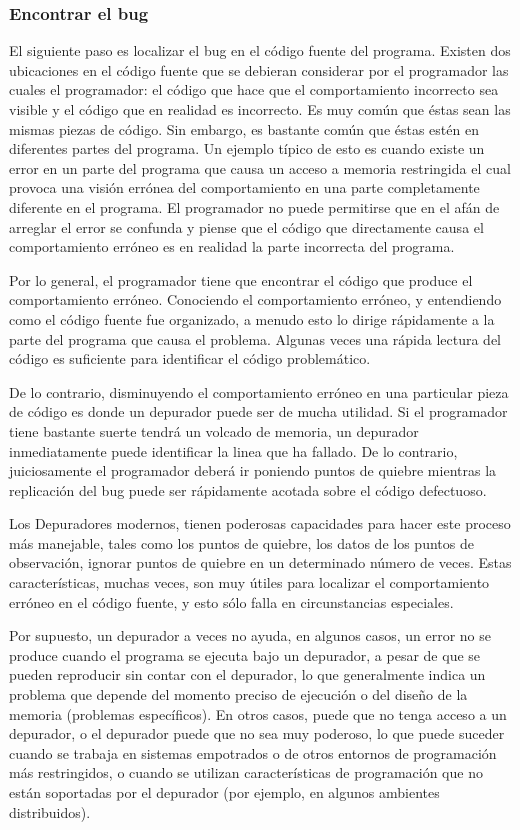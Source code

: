\documentclass[12pt,legalpaper]{report}
\begin{document}
\subsubsection{Encontrar el bug}

El siguiente paso es localizar el bug en el código fuente del programa.  Existen dos ubicaciones en el código fuente que se debieran considerar por el programador las cuales el programador: el código que hace que el comportamiento incorrecto sea visible y el código que en realidad es incorrecto.  Es muy común que éstas sean las mismas piezas de código.  Sin embargo, es bastante común que éstas estén en diferentes partes del programa.  Un ejemplo típico de esto es cuando existe un error en un parte del programa que causa un acceso a memoria restringida el cual provoca una visión errónea del comportamiento en una parte completamente diferente en el programa.  El programador no puede permitirse que en el afán de arreglar el error se confunda y piense que el código que directamente causa el comportamiento erróneo es en realidad la parte incorrecta del programa.

Por lo general, el programador tiene que encontrar el código que produce el comportamiento erróneo.  Conociendo el comportamiento erróneo, y entendiendo como el código fuente fue organizado, a menudo esto lo dirige rápidamente a la parte del programa que causa el problema.  Algunas veces una rápida lectura del código es suficiente para identificar el código problemático.

De lo contrario, disminuyendo el comportamiento erróneo en una particular pieza de código es donde un depurador puede ser de mucha utilidad.  Si el programador tiene bastante suerte tendrá un volcado de memoria, un depurador inmediatamente puede identificar la linea que ha fallado.  De lo contrario, juiciosamente el programador deberá ir poniendo puntos de quiebre mientras la replicación del bug puede ser rápidamente acotada sobre el código defectuoso.

Los Depuradores modernos, tienen poderosas capacidades para hacer este proceso más manejable, tales como los puntos de quiebre, los datos de los puntos de observación, ignorar puntos de quiebre en un determinado número de veces.  Estas características, muchas veces, son muy útiles para localizar el comportamiento erróneo en el código fuente, y esto sólo falla en circunstancias especiales.

Por supuesto, un depurador a veces no ayuda, en algunos casos, un error no se produce cuando el programa se ejecuta bajo un depurador, a pesar de que se pueden reproducir sin contar con el depurador, lo que generalmente indica un problema que depende del momento preciso de ejecución o del diseño de la memoria (problemas específicos). En otros casos, puede que no tenga acceso a un depurador, o el depurador puede que no sea muy poderoso, lo que puede suceder cuando se trabaja en sistemas empotrados o de otros entornos de programación más restringidos, o cuando se utilizan características de programación que no están soportadas por el depurador (por ejemplo, en algunos ambientes distribuidos).
\end{document}
